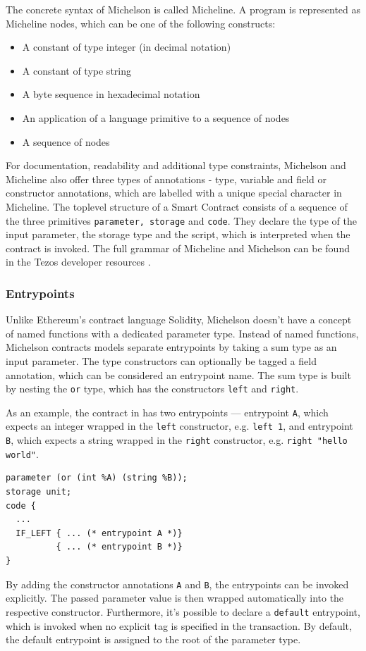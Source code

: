 The concrete syntax of Michelson is called Micheline. A program is represented as Micheline nodes, which can be one of the following constructs:
\begin{itemize}
\item A constant of type integer (in decimal notation)
\item A constant of type string
\item A byte sequence in hexadecimal notation
\item An application of a language primitive to a sequence of nodes
\item A sequence of nodes
\end{itemize}
For documentation, readability and additional type constraints, Michelson and Micheline also offer three types of annotations - type, variable and field or constructor annotations, which are labelled with a unique special character in Micheline. The toplevel structure of a Smart Contract consists of a sequence of the three primitives \texttt{parameter, storage} and \texttt{code}. They declare the type of the input parameter, the storage type and the script, which is interpreted when the contract is invoked. The full grammar of Micheline and Michelson can be found in the Tezos developer resources \cite{tezos_docs}.

\subsubsection{Entrypoints}
Unlike Ethereum's contract language Solidity, Michelson doesn't have a concept of named functions with a dedicated parameter type. Instead of named functions, Michelson contracts models separate entrypoints by taking a sum type as an input parameter. The type constructors can optionally be tagged a field annotation, which can be considered an entrypoint name. The sum type is built by nesting the \texttt{or} type, which has the constructors \texttt{left} and \texttt{right}.

As an example, the contract in  has two entrypoints --- entrypoint \texttt{A}, which expects an integer wrapped in the \texttt{left} constructor, e.g. \texttt{left 1}, and entrypoint \texttt{B}, which expects a string wrapped in the \texttt{right} constructor, e.g. \texttt{right "hello world"}.
\begin{lstlisting}[language=Michelson, numbers=none, caption=Michelson contract with two entrypoints, label=lst:entrypoints]
parameter (or (int %A) (string %B));
storage unit;
code {
  ...
  IF_LEFT { ... (* entrypoint A *)}
          { ... (* entrypoint B *)}
}
\end{lstlisting}
By adding the constructor annotations \texttt{A} and \texttt{B}, the entrypoints can be invoked explicitly. The passed parameter value is then wrapped automatically into the respective constructor. Furthermore, it's possible to declare a \texttt{default} entrypoint, which is invoked when no explicit tag is specified in the transaction. By default, the default entrypoint is assigned to the root of the parameter type.

